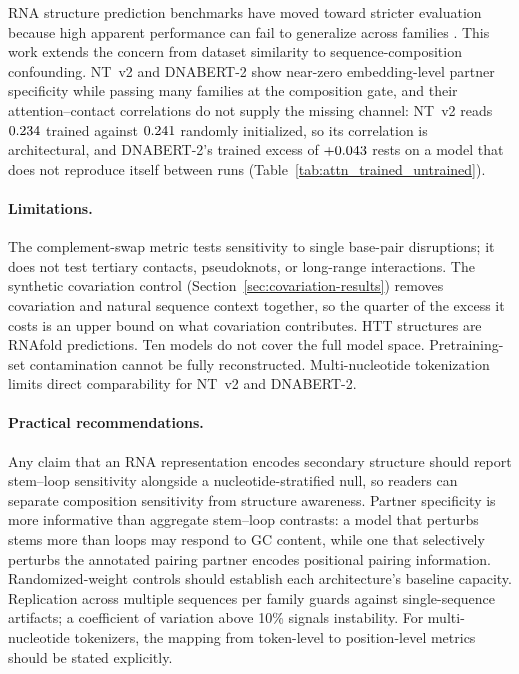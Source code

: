 \documentclass[11pt]{article}
\begin{document}
RNA structure prediction benchmarks have moved toward stricter evaluation
because high apparent performance can fail to generalize across families
\citep{szikszai2022generalization}. This work extends the concern from
dataset similarity to sequence-composition confounding. NT~v2 and DNABERT-2
show near-zero embedding-level partner specificity while passing many families
at the composition gate, and their attention--contact correlations do not
supply the missing channel: NT~v2 reads $0.234{}$ trained against
$0.241{}$ randomly initialized, so its correlation is
architectural, and DNABERT-2's trained excess of $+0.043{}$ rests
on a model that does not reproduce itself between runs
(Table~\ref{tab:attn_trained_untrained}).

\paragraph{Limitations.}
The complement-swap metric tests sensitivity to single base-pair disruptions;
it does not test tertiary contacts, pseudoknots, or long-range interactions.
The synthetic covariation control (Section~\ref{sec:covariation-results})
removes covariation and natural sequence context together, so the quarter of
the excess it costs is an upper bound on what covariation contributes. HTT structures
are RNAfold predictions. Ten models do not cover the full model space. Pretraining-set contamination cannot be
fully reconstructed. Multi-nucleotide tokenization limits direct
comparability for NT~v2 and DNABERT-2.

\paragraph{Practical recommendations.}
Any claim that an RNA representation encodes secondary structure should
report stem--loop sensitivity alongside a nucleotide-stratified null, so
readers can separate composition sensitivity from structure awareness.
Partner specificity is more informative than aggregate stem--loop contrasts:
a model that perturbs stems more than loops may respond to GC content, while
one that selectively perturbs the annotated pairing partner encodes
positional pairing information. Randomized-weight controls should establish
each architecture's baseline capacity. Replication across
multiple sequences per family guards against single-sequence artifacts; a
coefficient of variation above 10\% signals instability. For
multi-nucleotide tokenizers, the mapping from token-level to position-level
metrics should be stated explicitly.
\end{document}
